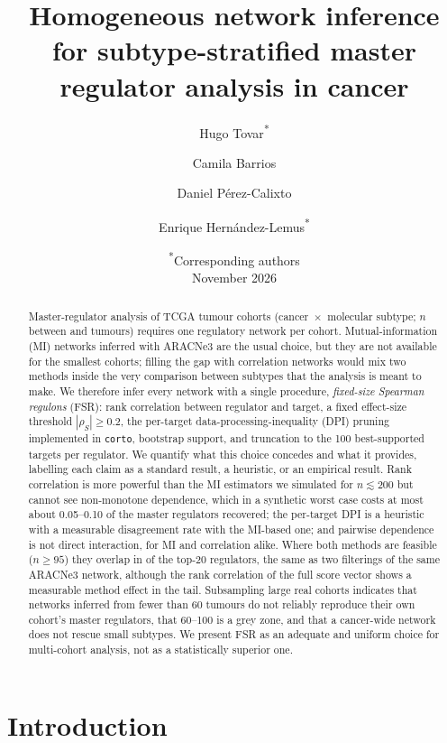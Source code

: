 \documentclass[11pt,a4paper]{article}
\title{Homogeneous network inference for subtype-stratified master regulator analysis in cancer}
\author{Hugo Tovar\textsuperscript{*} \and Camila Barrios \and Daniel P\'erez-Calixto \and Enrique Hern\'andez-Lemus\textsuperscript{*}}
\date{\small \textsuperscript{*}Corresponding authors\\[1ex] \normalsize November 2026}
\theoremstyle{plain}
\theoremstyle{remark}
\newcommand{\rhoS}{\rho_{S}}
\newcommand{\FSR}{FSR}
\begin{document}
\setlength{\emergencystretch}{2em}
\maketitle

\begin{abstract}
Master-regulator analysis of \Krealnanalysis{} TCGA tumour cohorts (cancer~$\times$~molecular subtype;
$n$ between \Knmin{} and \Knmax{} tumours) requires one regulatory network per cohort. Mutual-information (MI)
networks inferred with ARACNe3 are the usual choice, but they are not available for the smallest cohorts; filling the gap
with correlation networks would mix two methods inside the very comparison between subtypes that the analysis is
meant to make. We therefore infer every network with a single procedure, \emph{fixed-size Spearman regulons} (\FSR):
rank correlation between regulator and target, a fixed effect-size threshold $|\rhoS|\ge 0.2$, the per-target
data-processing-inequality (DPI) pruning implemented in \texttt{corto}, bootstrap support, and truncation to the 100
best-supported targets per regulator. We quantify what this choice concedes and what it provides, labelling each claim
as a standard result, a heuristic, or an empirical result. Rank correlation is more powerful than the MI estimators we
simulated for $n\lesssim200$ but cannot see non-monotone dependence, which in a synthetic worst case costs at most about
0.05--0.10 of the master regulators recovered; the per-target DPI is a heuristic with a measurable disagreement rate with
the MI-based one; and pairwise dependence is not direct interaction, for MI and correlation alike. Where both methods are
feasible ($n\ge95$) they overlap in \KAvsBmediantopTwoZero{} of the top-20 regulators, the same as two filterings of the
same ARACNe3 network, although the rank correlation of the full score vector shows a measurable method effect in the tail.
Subsampling large real cohorts indicates that networks inferred from fewer than 60 tumours do not reliably reproduce
their own cohort's master regulators, that 60--100 is a grey zone, and that a cancer-wide network does not rescue small
subtypes. We present \FSR{} as an adequate and uniform choice for multi-cohort analysis, not as a statistically superior one.
\end{abstract}

\section{Introduction}
\end{document}
